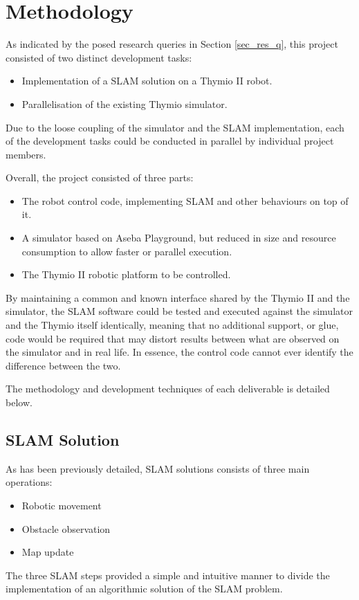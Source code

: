 \section{Methodology}
As indicated by the posed research queries in Section \ref{sec_res_q},
this project consisted of two distinct development tasks:

\begin{itemize}
\item Implementation of a SLAM solution on a Thymio II robot.
\item Parallelisation of the existing Thymio simulator.
\end{itemize}

Due to the loose coupling of the simulator and the SLAM implementation, each of
the development tasks could be conducted in parallel by individual project
members.

Overall, the project consisted of three parts:
\begin{itemize}
    \item The robot control code, implementing SLAM and other behaviours
        on top of it.
    \item A simulator based on Aseba Playground, but reduced in size and
        resource consumption to allow faster or parallel execution.
    \item The Thymio II robotic platform to be controlled.
\end{itemize}
By maintaining a common and known interface shared by the Thymio II and the
simulator, the SLAM software could be tested and executed against the simulator
and the Thymio itself identically, meaning that no additional support, or glue,
code would be required that may distort results between what are observed on
the simulator and in real life. In essence, the control code cannot ever
identify the difference between the two.

The methodology and development techniques of each deliverable is detailed
below.

\subsection{SLAM Solution}
As has been previously detailed, SLAM solutions consists of three main
operations:
\begin{itemize}
    \item Robotic movement
    \item Obstacle observation
    \item Map update
\end{itemize}
The three SLAM steps provided a simple and intuitive manner to divide the
implementation of an algorithmic solution of the SLAM problem.

